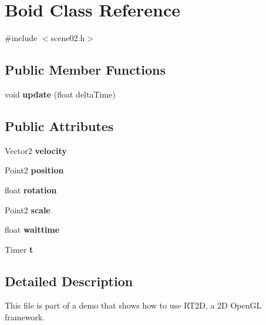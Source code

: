 \hypertarget{class_boid}{}\section{Boid Class Reference}
\label{class_boid}


{\ttfamily \#include $<$scene02.\+h$>$}

\subsection*{Public Member Functions}
\begin{DoxyCompactItemize}
\item 
\mbox{\label{class_boid_abacc5b57737ab72b8fd0c2f6521d8f42}} 
void {\bfseries update} (float delta\+Time)
\end{DoxyCompactItemize}
\subsection*{Public Attributes}
\begin{DoxyCompactItemize}
\item 
\mbox{\label{class_boid_aa6455358e76571cdb7a05df210bc2d8c}} 
Vector2 {\bfseries velocity}
\item 
\mbox{\label{class_boid_afdfe88c3802c6d09072a5b19fde9eb8a}} 
Point2 {\bfseries position}
\item 
\mbox{\label{class_boid_aaa37997aae7557a214791420a652ebb7}} 
float {\bfseries rotation}
\item 
\mbox{\label{class_boid_a8895ccc4eeddf79101a3ca2cf8c32eb7}} 
Point2 {\bfseries scale}
\item 
\mbox{\label{class_boid_a19e8b46421cfff55fe2b60ec9e13a478}} 
float {\bfseries waittime}
\item 
\mbox{\label{class_boid_aa4f72fbe11f38833baba65af16f613b3}} 
Timer {\bfseries t}
\end{DoxyCompactItemize}


\subsection{Detailed Description}
This file is part of a demo that shows how to use R\+T2D, a 2D Open\+GL framework.



